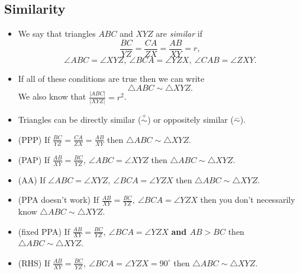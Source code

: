 \documentclass{article}
\begin{document}
  \subsection{Similarity}
  \begin{itemize}
    \item We say that triangles $ABC$ and $XYZ$ are \emph{similar} if
      $$\frac{BC}{YZ}=\frac{CA}{ZX}=\frac{AB}{XY}=r,$$
      $$\angle ABC=\angle XYZ,\
      \angle BCA=\angle YZX,\ \angle CAB=\angle ZXY.$$

    \item If all of these conditions are true then we can write $$\triangle
      ABC\sim\triangle XYZ.$$ We also know that $\frac{|ABC|}{|XYZ|}=r^2$.

    \item Triangles can be directly similar ($\overset +\sim$) or oppositely
      similar ($\overset -\sim$).

    \item (PPP) If $\frac{BC}{YZ}=\frac{CA}{ZX}=\frac{AB}{XY}$ then $\triangle ABC\sim\triangle XYZ$.
    \item (PAP) If $\frac{AB}{XY}=\frac{BC}{YZ},\ \angle ABC=\angle XYZ$ then $\triangle
      ABC\sim\triangle XYZ$.
    \item (AA) If $\angle ABC=\angle XYZ,\ \angle BCA=\angle YZX$ then $\triangle
      ABC\sim\triangle XYZ$.
    \item (PPA doesn't work) If $\frac{AB}{XY}=\frac{BC}{YZ},\ \angle BCA=\angle YZX$ then you don't necessarily know
      $\triangle ABC\sim\triangle XYZ$.
    \item (fixed PPA) If $\frac{AB}{XY}=\frac{BC}{YZ},\ \angle BCA=\angle YZX$ \textbf{and $AB>BC$} then
      $\triangle ABC\sim\triangle XYZ$.
    \item (RHS) If $\frac{AB}{XY}=\frac{BC}{YZ},\ \angle BCA=\angle YZX=90^\circ$ then $\triangle
      ABC\sim\triangle XYZ$.
  \end{itemize}
\end{document}
